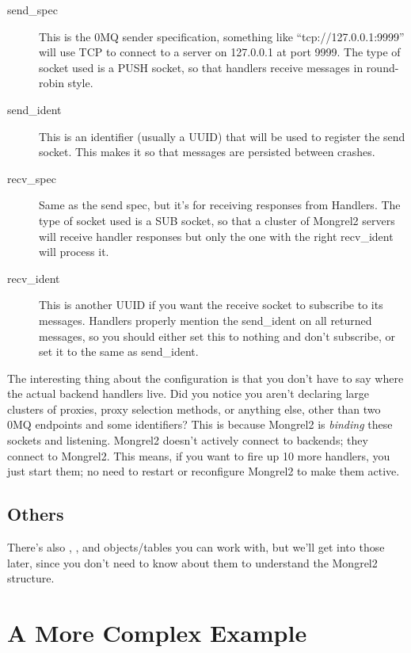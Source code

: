\begin{description}
\item[send\_spec]  This is the 0MQ sender specification, something like ``tcp://127.0.0.1:9999'' will
    use TCP to connect to a server on 127.0.0.1 at port 9999.  The type of socket used is a PUSH
    socket, so that handlers receive messages in round-robin style.
\item[send\_ident] This is an identifier (usually a UUID) that will be used to register the send
    socket.  This makes it so that messages are persisted between crashes.
\item[recv\_spec] Same as the send spec, but it's for receiving responses from Handlers.  The type of
    socket used is a SUB socket, so that a cluster of Mongrel2 servers will receive handler responses
    but only the one with the right recv\_ident will process it.
\item[recv\_ident] This is another UUID if you want the receive socket to subscribe to its messages.
    Handlers properly mention the send\_ident on all returned messages, so you should either set this
    to nothing and don't subscribe, or set it to the same as send\_ident.
\end{description}

The interesting thing about the  configuration is that you don't have to say where the
actual backend handlers live.  Did you notice you aren't declaring large clusters of proxies, proxy selection
methods, or anything else, other than two 0MQ endpoints and some identifiers?  This is because Mongrel2 is
\emph{binding} these sockets and listening.  Mongrel2 doesn't actively connect to backends; they connect
to Mongrel2.  This means, if you want to fire up 10 more handlers, you just start them; no need to restart
or reconfigure Mongrel2 to make them active.


\subsection{Others}

There's also , , and  objects/tables you can work
with, but we'll get into those later, since you don't need to know about them to understand
the Mongrel2 structure.



\section{A More Complex Example}

